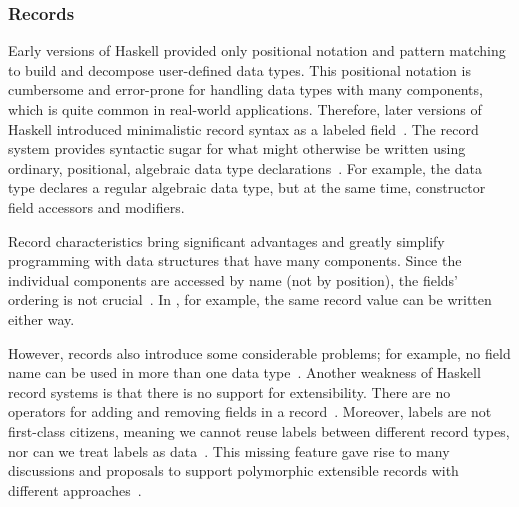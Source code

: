 \begin{frame}\frametitle{Records}
    
    Early versions of Haskell provided only positional notation and pattern matching to build and decompose user-defined data types. This positional notation is cumbersome and error-prone for handling data types with many components, which is quite common in real-world applications. Therefore, later versions of Haskell introduced minimalistic record syntax as a labeled field~\cite{lw-ext-records, history-of-haskell}.
The record system provides syntactic sugar for what might 
otherwise be written using ordinary, positional, 
algebraic data type declarations~\cite{lw-ext-records}. For example, 
the data type  declares a regular algebraic data type, 
but at the same time, 
constructor field accessors and modifiers. 


Record characteristics bring significant advantages and greatly simplify programming with data structures that have many components. Since the individual components are accessed by name (not by position), the fields' ordering is not crucial~\cite{lw-ext-records}.
In , for example, 
the same record value can be written either way.

However, records also introduce some considerable problems; for example, 
no field name can be used in more than one data type~\cite{lw-ext-records}.
Another weakness of Haskell record systems is that there is no support for extensibility. 
There are no operators for adding and removing fields in a record~\cite{poly-ext-records, hlist}. 
Moreover, labels are not first-class citizens, 
meaning we cannot reuse labels between different record types, 
nor can we treat labels as data~\cite{hlist}.
This missing feature gave rise to many discussions and proposals to support polymorphic extensible records with different approaches~\cite{history-of-haskell, poly-ext-records, hlist, basic-tlp}.

\end{frame}

